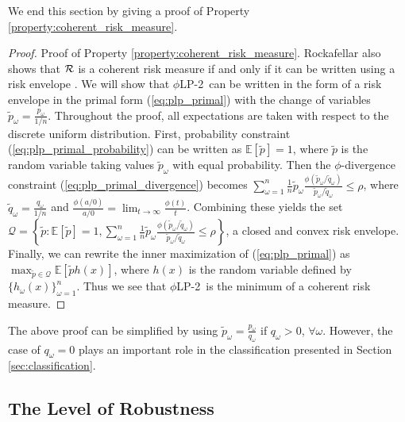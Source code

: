 \documentclass[ijoc,letterpaper]{informs3} %
\newcommand{\E}{\mathbb{E}}
\newcommand{\e}[1]{\E \left[ #1 \right]}
\newcommand{\plp}{$\phi$LP-2}
\begin{document}
We end this section by giving a proof of Property \ref{property:coherent_risk_measure}.

\begin{proof}{\sc Proof of Property \ref{property:coherent_risk_measure}.}
	Rockafellar also shows that $\cal R$ is a coherent risk measure if and only if it can be written using a risk envelope \cite{rockafellar2007coherent}.
	We will show that \plp\ can be written in the form of a risk envelope in the primal form (\ref{eq:plp_primal}) with the change of variables $\tilde{p}_\omega = \frac{p_\omega}{1/n}$.
	Throughout the proof, all expectations are taken with respect to the discrete uniform distribution.
	First, probability constraint (\ref{eq:plp_primal_probability}) can be written as $\e{\tilde{p}} = 1$, where $\tilde{p}$ is the random variable taking values $\tilde{p}_\omega$ with equal probability.
	Then the $\phi$-divergence constraint (\ref{eq:plp_primal_divergence}) becomes $\sum_{\omega=1}^n \frac{1}{n} \tilde{p}_\omega \frac{\phi\left(\tilde{p}_\omega/\tilde{q}_\omega\right)}{\tilde{p}_\omega/\tilde{q}_\omega} \leq \rho$, where $\tilde{q}_\omega = \frac{q_\omega}{1/n}$ and $\frac{\phi(a/0)}{a/0} = \lim_{t \rightarrow \infty} \frac{\phi(t)}{t}$.
	Combining these yields the set $\mathcal{Q} = \left\{\tilde{p} : \e{\tilde{p}} = 1, \sum_{\omega=1}^n \frac{1}{n} \tilde{p}_\omega \frac{\phi\left(\tilde{p}_\omega/\tilde{q}_\omega\right)}{\tilde{p}_\omega/\tilde{q}_\omega} \leq \rho \right\}$, a closed and convex risk envelope.
	Finally, we can rewrite the inner maximization of (\ref{eq:plp_primal}) as $\max_{\tilde{p} \in \mathcal{Q}} \e{\tilde{p} h(x)}$, where $h(x)$ is the random variable defined by $\{h_\omega(x)\}_{\omega=1}^n$.
	Thus we see that \plp\ is the minimum of a coherent risk measure.
	\Halmos
\end{proof}

\begin{remark}
	The above proof can be simplified by using $\tilde{p}_\omega = \frac{p_\omega}{q_\omega}$ if $q_\omega > 0$, $\forall \omega$.
	However, the case of $q_\omega = 0$ plays an important role in the classification presented in Section \ref{sec:classification}.
\end{remark}



\subsection{The Level of Robustness}
\label{ssec:robust_level}
\end{document}
